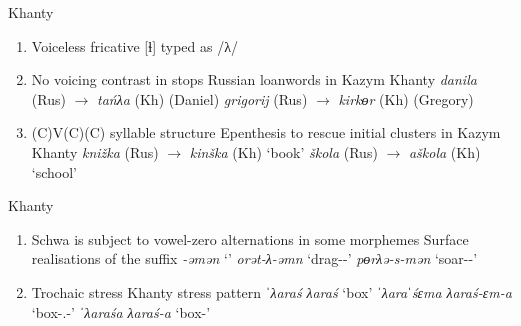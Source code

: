 \documentclass[10 pt, handout]{beamer}
\begin{document}
\begin{frame}{Khanty}

	\begin{enumerate}[$\gg$]
		\item Voiceless fricative [ɬ] typed as /λ/
		\item No voicing contrast in stops
			\pex Russian loanwords in Kazym Khanty
				\a \emph{danila} (Rus) $\rightarrow$ \emph{tańλa} (Kh) \hfill (Daniel)
				\a \emph{grigorij} (Rus) $\rightarrow$ \emph{kirkɵr} (Kh) \hfill (Gregory)
			\xe
		\item (C)V(C)(C) syllable structure
			\pex Epenthesis to rescue initial clusters in Kazym Khanty
				\a \emph{kni\v{z}ka} (Rus) $\rightarrow$ \emph{kinška} (Kh) \hfill `book'
				\a \emph{škola} (Rus) $\rightarrow$ \emph{aškola} (Kh) \hfill `school'
			\xe
	\end{enumerate}

\end{frame}

\begin{frame}{Khanty}

	\begin{enumerate}[$\gg$]
		\item Schwa is subject to vowel-zero alternations in some morphemes
			\pex Surface realisations of the suffix \emph{-əmən} `{\Fdu}'
				\a \emph{orət-λ-əmn} \hfill `drag-{\Npst}-{\Fdu}'
				\a \emph{pɵrλə-s-mən} \hfill `soar-{\Pst}-{\Fdu}'
			\xe 
		\item Trochaic stress
			\pex Khanty stress pattern
				\a \emph{ˈλaraś} \hfill \emph{λaraś} `box'
				\a \emph{ˈλaraˈśɛma} \hfill \emph{λaraś-ɛm-a} `box-{\Poss}.{\Fsg}-{\Dat}'
				\a \emph{ˈλaraśa} \hfill \emph{λaraś-a} `box-{\Dat}'
			\xe 
	\end{enumerate}

\end{frame}
\end{document}

